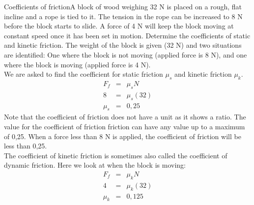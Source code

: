 \begin{wex}{Coefficients of friction}{A block of wood weighing 32 N is placed on a rough, flat incline and a rope is tied to it. The tension in the rope can be increased to 8 N before the block starts to slide. A force of 4 N will keep the block moving at constant speed once it has been set in motion. Determine the coefficients of static and kinetic friction.}
{
The weight of the block is given (32 N) and two situations are identified: One where the block is not moving (applied force is 8 N), and one where the block is moving (applied force is 4 N). \\
We are asked to find the coefficient for static friction $\mu_s$ and kinetic friction $\mu_k$.\\
\begin{eqnarray*}
F_f &=& \mu_s N\\
8 &=& \mu_s (32)\\
\mu_s &=& 0,25
\end{eqnarray*}
Note that the coefficient of friction does not have a unit as it shows a ratio. The value for the coefficient of friction friction can have any value up to a maximum of 0,25. When a force less than 8 N is applied, the coefficient of friction will be less than 0,25.\\

The coefficient of kinetic friction is sometimes also called the coefficient of dynamic friction. Here we look at when the block is moving:
\begin{eqnarray*}
F_f &=& \mu_k N\\
4 &=& \mu_k (32)\\
\mu_k &=& 0,125
\end{eqnarray*}
}
\end{wex}


